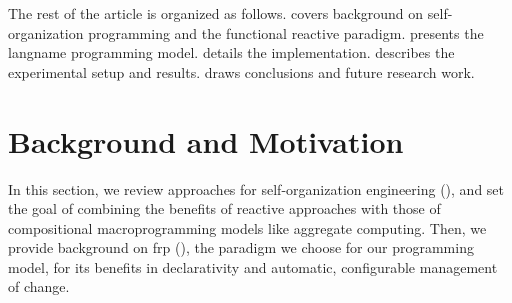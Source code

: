%
%

The rest of the article is organized as follows.
%
 covers background on self-organization programming and the functional reactive paradigm.
%
 presents the \ac{langname} programming model.
%
 details the implementation.
%
 describes the experimental setup and results.
%
 draws conclusions and future research work.
 
\section{Background and Motivation}\label{acsos2023-frp:sec:background}


In this section,
 we review approaches for self-organization engineering (),
 and set the goal of combining the benefits of reactive approaches
with those of compositional macroprogramming models like aggregate computing.
%
Then, we provide background on \ac{frp} (),
 the paradigm we choose for our programming model,
 for its benefits in declarativity and
 automatic, configurable management of change.

